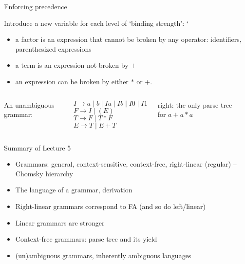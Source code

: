 \documentclass[handout]{beamer}
\begin{document}
\begin{frame}{Enforcing precedence}

	Introduce a new variable for each level of `binding strength':
`	\begin{itemize}
		\item a \alert{factor} is an expression that cannot be broken by any operator: identifiers, parenthesized expressions
		\item a \alert{term} is an expression not broken by $+$
		\item an \alert{expression} can be broken by either $*$ or $+$.
	\end{itemize}
	
	\begin{columns}


		An unambiguous grammar:

		\bigskip
		
		$I\rightarrow  a\mid  b\mid Ia\mid Ib\mid I0\mid I1$\\
		$F\rightarrow  I\mid (E) $\\
		$T\rightarrow  F\mid T*F $\\
		$E\rightarrow  T\mid E+T $

		\bigskip

		right: the only parse tree for $a+a*a$
			
		
		\begin{center}
			\scalebox{0.8}{
				\begin{forest}
					[E [E[T[F[I[a]]]]][+][T[T[F[I[a]]]][*][F[I[a]]]]]
				\end{forest}
			}
		\end{center}
				
	\end{columns}

\end{frame}


\begin{frame}{Summary of Lecture 5}
	
	\begin{itemize}
		\item Grammars: general, context-sensitive, context-free, right-linear (regular) -- Chomsky hierarchy
		\item The language of a grammar, derivation
		\item Right-linear grammars correspond to FA (and so do left/linear)
		\item Linear grammars are stronger
		\item Context-free grammars: parse tree and its yield
		\item (un)ambiguous grammars, inherently ambiguous languages
	\end{itemize}

\end{frame}
\end{document}
